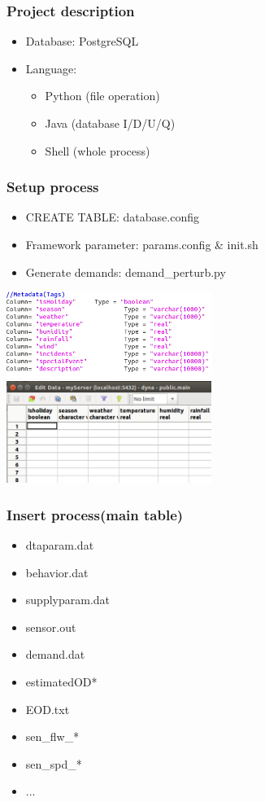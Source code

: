 \documentclass[12pt]{beamer}
\begin{document}
\begin{frame}
\frametitle{Project description}
\begin{itemize}
\item Database: PostgreSQL
\item Language: 
\begin{itemize}
      \item{Python (file operation)}
      \item{Java (database I/D/U/Q)}
      \item{Shell (whole process)}
\end{itemize}
\end{itemize}
\end{frame}



\begin{frame}
\frametitle{Setup process}
\begin{itemize}
\item CREATE TABLE: database.config
\item Framework parameter: params.config \& init.sh
\item Generate demands: demand\_perturb.py 
\end{itemize}
\includegraphics[width = 0.5\textwidth]{screenshot_table.png}
\includegraphics[width = 0.5\textwidth]{screenshot_pgadmin.png}
\end{frame}



\begin{frame}
\frametitle{Insert process(main table)}
\begin{itemize}
\item dtaparam.dat
\item behavior.dat
\item supplyparam.dat
\item sensor.out
\item demand.dat
\item estimatedOD*
\item EOD.txt
\item sen\_flw\_*
\item sen\_spd\_*
\item ...
\end{itemize}
\end{frame}
\end{document}
